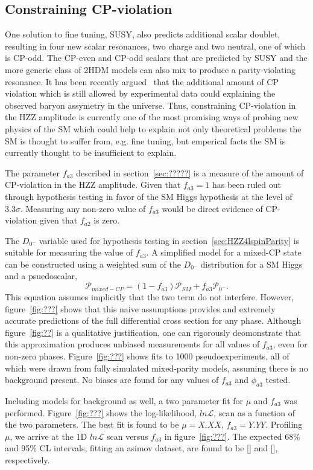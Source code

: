 \subsection{Constraining CP-violation}
\label{sec:HZZ4lcpViolation}

One solution to fine tuning, SUSY,
also predicts additional scalar doublet, resulting in four new 
scalar resonances, two charge and two neutral, one of which 
is CP-odd.  
The CP-even and CP-odd
scalars that are predicted by SUSY and the more generic class
of 2HDM models can also mix to produce a parity-violating 
resonance.  
It has been recently argued~\cite{???} that
the additional amount of CP violation which is still allowed by
experimental data could explaining the observed baryon assymetry
in the universe.  Thus, constraining CP-violation in the HZZ 
amplitude is currently one of the most promising ways of probing
new physics of the SM which could help to explain not only 
theoretical problems the SM is thought to suffer from, e.g. 
fine tuning, but emperical facts the SM is currently thought to
be insufficient to explain.  

The parameter $f_{a3}$ 
described in section~\ref{sec:?????} is a measure of the amount
of CP-violation in the HZZ amplitude.  Given that $f_{a3}=1$
has been ruled out through hypothesis testing in favor of the
SM Higgs hypothesis at the level of $3.3\sigma$.  Measuring any
non-zero value of $f_{a3}$ would be direct evidence of CP-violation
given that $f_{a2}$ is zero.  

The $D_{0^-}$ variable used for hypothesis testing in
section~\ref{sec:HZZ4lspinParity} is suitable for measuring the
value of $f_{a3}$.  A simplified model for a mixed-CP state can 
be constructed 
using a weighted sum of the $D_{0^-}$ distribution for a SM Higgs
and a psuedoscalar, 
\begin{equation}
\mathscr{P}_{mixed-CP} = (1-f_{a3})\mathscr{P}_{SM} 
+ f_{a3}\mathscr{P}_{0^-}.
\end{equation}
This equation assumes implicitly that the two term do not 
interfere.  However, figure~\ref{fig:???} shows that this naive
assumptions provides and extremely accurate predictions of the 
full differential cross section for any phase.  Although 
figure~\ref{fig:??} is a qualitative justification, one can
rigorously deomonstrate that this approximation produces unbiased
measurements for all values of $f_{a3}$, even for non-zero phases.
Figure~\ref{fig:???} shows fits to 1000 pseudoexperiments, all
of which were drawn from fully simulated mixed-parity models, 
assuming there is no background present.  
No biases are found for any values of $f_{a3}$ and $\phi_{a3}$
tested.  

Including models for background as well, a two parameter fit for
$\mu$ and $f_{a3}$ was performed.  Figure~\ref{fig:???} shows the
log-likelihood, $ln\mathscr{L}$, scan as a function of the two 
parameters.  The best fit is found to be $\mu=X.XX$, $f_{a3}=Y.YY$.
Profiling $\mu$, we arrive at the 1D $ln\mathscr{L}$ scan versus
$f_{a3}$ in figure~\ref{fig:???}.  The expected 68\% and 95\% CL 
intervals, fitting an asimov dataset, are found to be [] and [], 
respectively. 


